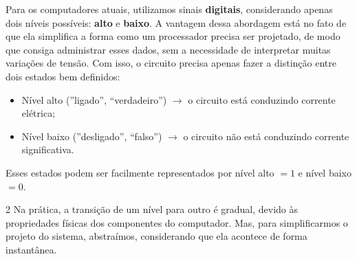 \documentclass[12pt]{article}
\begin{document}
\noindent
Para os computadores atuais, utilizamos sinais \textbf{digitais}, considerando apenas dois níveis possíveis: \textbf{alto} e \textbf{baixo}.
\vspace{0.2cm} 
A vantagem dessa abordagem está no fato de que ela simplifica a forma como um processador precisa ser projetado, de modo que consiga administrar esses dados, sem a necessidade de interpretar muitas variações de tensão. Com isso, o circuito precisa apenas fazer a distinção entre dois estados bem definidos:

\begin{itemize}
   \item Nível alto (”ligado”, “verdadeiro”) $\rightarrow{}$ o circuito está conduzindo corrente elétrica; 
   \item Nível baixo (”desligado”, “falso”) $\rightarrow{}$ o circuito não está conduzindo corrente significativa.
\end{itemize}

\vspace{0.3cm} 
\noindent
Esses estados podem ser facilmente representados por nível alto $= 1$ e nível baixo $= 0$.

\vspace{0.1cm}
\begin{multicols}{2}
\noindent
Na prática, a transição de um nível para outro é gradual, devido às propriedades físicas dos componentes do computador. Mas, para simplificarmos o projeto do sistema, abstraímos, considerando que ela acontece de forma instantânea.

\columnbreak
{}
\end{multicols}
\end{document}
